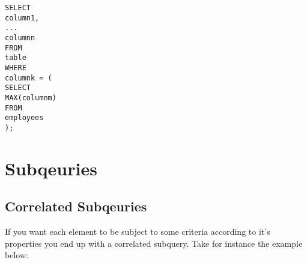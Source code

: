 \documentclass[10pt, english]{article}
\begin{document}
\texttt{SELECT \\
\hspace*{10pt} column1, \\
... \\
\hspace*{10pt} columnn \\
FROM \\
\hspace*{10pt} table \\
WHERE \\
\hspace*{10pt} columnk = (\\
\hspace*{10pt} \hspace*{10pt} SELECT \\
\hspace*{10pt} \hspace*{10pt} \hspace*{10pt} MAX(columnm) \\
\hspace*{10pt} \hspace*{10pt} FROM \\
\hspace*{10pt} \hspace*{10pt} \hspace*{10pt} employees \\ 
);}



\newpage
\section{Subqeuries}
\subsection{Correlated Subqeuries}
If you want each element to be subject to some criteria according to it's properties you end up with a correlated subquery. Take for instance the example below:
\end{document}
